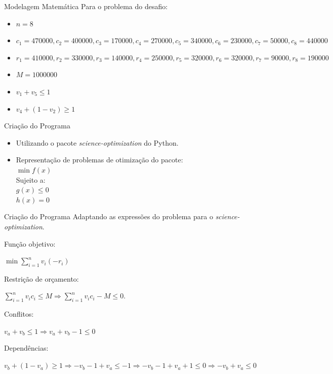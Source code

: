 \documentclass{beamer}
\begin{document}
\begin{frame}{Modelagem Matemática}
Para o problema do desafio:\pause
\begin{itemize}
\item $n = 8$\pause
\item \footnotesize $c_1 = 470000, c_2 = 400000, c_3 = 170000, c_4 = 270000, c_5 = 340000, c_6 = 230000, c_7=50000,c_8=440000$\pause
\item $r_1 = 410000, r_2 = 330000, r_3 = 140000, r_4 = 250000, r_5 = 320000, r_6 = 320000, r_7=90000,r_8=190000$\normalsize\pause
\item $M = 1000000$\pause
\item $v_1 + v_5 \le 1$\pause
\item $v_4+(1-v_2) \ge 1$
\end{itemize}
\end{frame}

\begin{frame}{Criação do Programa}
\begin{itemize}
\item Utilizando o pacote \emph{science-optimization} do Python.\pause
\item Representação de problemas de otimização do pacote:\\\pause
 $\min f(x)$\\
 Sujeito a:\\
 $g(x) \le 0$\\
 $h(x) = 0$
\end{itemize}
\end{frame}

\begin{frame}{Criação do Programa}
Adaptando as expressões do problema para o \emph{science-optimization}.\pause

Função objetivo:
\begin{center}
$\min \sum\limits_{i=1}^n v_i(-r_i)$
\end{center}\pause

Restrição de orçamento:
\begin{center}
$\sum\limits_{i=1}^n v_ic_i \le M \Rightarrow \sum\limits_{i=1}^n v_ic_i - M \le 0$.
\end{center}\pause

Conflitos:
\begin{center}
$v_a+v_b \le 1 \Rightarrow v_a+v_b - 1 \le 0$
\end{center}\pause

Dependências:
\begin{center}
$v_b+(1-v_a) \ge 1 \Rightarrow -v_b-1+v_a \le -1 \Rightarrow -v_b-1+v_a +1 \le 0 \Rightarrow -v_b+v_a \le 0$
\end{center}
\end{frame}
\end{document}
